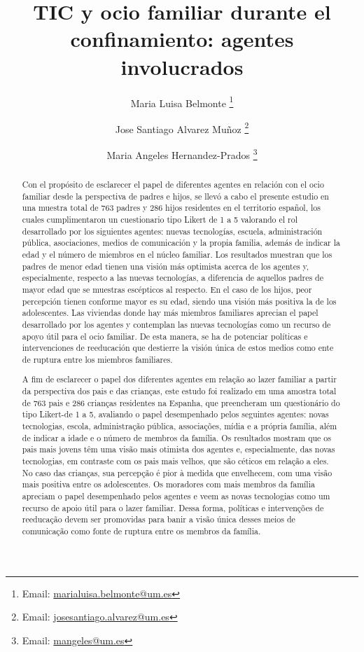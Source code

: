 \documentclass{textolivre}
\title{TIC y ocio familiar durante el confinamiento: agentes involucrados}
\author[1]{Maria Luisa Belmonte \orcid{0000-0002-1475-3690} \thanks{Email: \url{marialuisa.belmonte@um.es}}}
\author[1]{Jose Santiago Alvarez Muñoz \orcid{0000-0002-9740-6175} \thanks{Email: \url{josesantiago.alvarez@um.es}}}
\author[2]{Maria Angeles Hernandez-Prados \orcid{0000-0002-3617-215X} \thanks{Email: \url{mangeles@um.es}}}
\affil[1]{Universidad de Murcia, Facultad de Educación, Departamento de Métodos de Investigación y Diagnóstico en Educación, Murcia, España.}
\affil[2]{Universidad de Murcia, Facultad de Educación, Departamento de Teoría e Historia de la Educación, Murcia, España.}
\begin{document}
\maketitle

\begin{polyabstract}
\begin{abstract}
Con el propósito de esclarecer el papel de diferentes agentes en relación con el ocio familiar desde la perspectiva de padres e hijos, se llevó a cabo el presente estudio en una muestra total de 763 padres y 286 hijos residentes en el territorio español, los cuales cumplimentaron un cuestionario tipo Likert de 1 a 5 valorando el rol desarrollado por los siguientes agentes: nuevas tecnologías, escuela, administración pública, asociaciones, medios de comunicación y la propia familia, además de indicar la edad y el número de miembros en el núcleo familiar. Los resultados muestran que los padres de menor edad tienen una visión más optimista acerca de los agentes y, especialmente, respecto a las nuevas tecnologías, a diferencia de aquellos padres de mayor edad que se muestras escépticos al respecto. En el caso de los hijos, peor percepción tienen conforme mayor es su edad, siendo una visión más positiva la de los adolescentes. Las viviendas donde hay más miembros familiares aprecian el papel desarrollado por los agentes y contemplan las nuevas tecnologías como un recurso de apoyo útil para el ocio familiar. De esta manera, se ha de potenciar políticas e intervenciones de reeducación que destierre la visión única de estos medios como ente de ruptura entre los miembros familiares. 

\end{abstract}

\begin{portuguese}
\begin{abstract}
A fim de esclarecer o papel dos diferentes agentes em relação ao lazer familiar a partir da perspectiva dos pais e das crianças, este estudo foi realizado em uma amostra total de 763 pais e 286 crianças residentes na Espanha, que preencheram um questionário do tipo Likert-de 1 a 5, avaliando o papel desempenhado pelos seguintes agentes: novas tecnologias, escola, administração pública, associações, mídia e a própria família, além de indicar a idade e o número de membros da família. Os resultados mostram que os pais mais jovens têm uma visão mais otimista dos agentes e, especialmente, das novas tecnologias, em contraste com os pais mais velhos, que são céticos em relação a eles. No caso das crianças, sua percepção é pior à medida que envelhecem, com uma visão mais positiva entre os adolescentes. Os moradores com mais membros da família apreciam o papel desempenhado pelos agentes e veem as novas tecnologias como um recurso de apoio útil para o lazer familiar. Dessa forma, políticas e intervenções de reeducação devem ser promovidas para banir a visão única desses meios de comunicação como fonte de ruptura entre os membros da família.


\end{abstract}
\end{portuguese}
\end{polyabstract}
\end{document}
